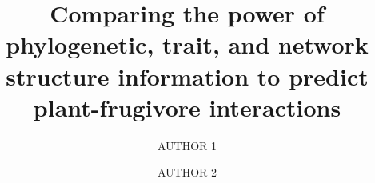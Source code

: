\documentclass[openacc]{rsproca_new}%
\begin{document}
\titlehead{Research}



\title{Comparing the power of phylogenetic, trait, and network structure information to predict plant-frugivore interactions}

\author[a,*]{AUTHOR 1}
\author[a]{AUTHOR 2}


\subject{Ecology}


\end{document}
